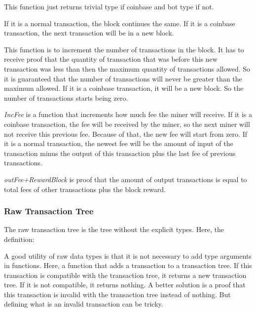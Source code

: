 
This function just returns trivial type if coinbase and bot type if not.


If it is a normal transaction, the block continues the same.
If it is a coinbase transaction, the next transaction will be in a new block.


This function is to increment the number of transactions in the block.
It has to receive proof that the quantity of transaction that was before this new transaction was
less than then the maximum quantity of transactions allowed.
So it is guaranteed that the number of transactions will never be greater than the maximum allowed.
If it is a coinbase transaction, it will be a new block.
So the number of transactions starts being zero.


\emph{IncFee} is a function that increments how much fee the miner will receive.
If it is a coinbase transaction, the fee will be received by the miner,
so the next miner will not receive this previous fee.
Because of that, the new fee will start from zero.
If it is a normal transaction, the newest fee will be the amount of input of the transaction minus
the output of this transaction plus the last fee of previous transactions.


\emph{outFee+RewardBlock} is proof that the amount of output transactions is equal to total fees of
other transactions plus the block reward.

\subsubsection{Raw Transaction Tree}

The raw transaction tree is the tree without the explicit types.
Here, the definition:


A good utility of raw data types is that it is not necessary to add type arguments in functions.
Here, a function that adds a transaction to a transaction tree.
If this transaction is compatible with the transaction tree,
it returns a new transaction tree.
If it is not compatible, it returns nothing.
A better solution is a proof that this transaction is invalid with the transaction tree
instead of nothing.
But defining what is an invalid transaction can be tricky.

